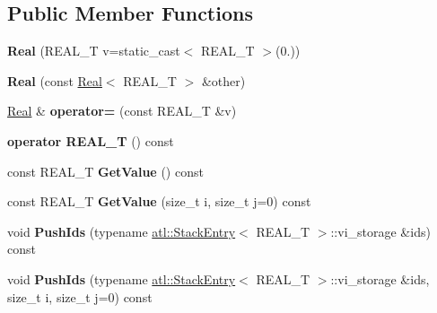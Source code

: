 \subsection*{Public Member Functions}
\begin{DoxyCompactItemize}
\item 
\hypertarget{structatl_1_1_real_a3ef54e5b25ee5800cb9cc3a6702e54c2}{{\bfseries Real} (R\+E\+A\+L\+\_\+\+T v=static\+\_\+cast$<$ R\+E\+A\+L\+\_\+\+T $>$(0.))}\label{structatl_1_1_real_a3ef54e5b25ee5800cb9cc3a6702e54c2}

\item 
\hypertarget{structatl_1_1_real_abdc6f5cef7138b4699f6405eed513864}{{\bfseries Real} (const \hyperlink{structatl_1_1_real}{Real}$<$ R\+E\+A\+L\+\_\+\+T $>$ \&other)}\label{structatl_1_1_real_abdc6f5cef7138b4699f6405eed513864}

\item 
\hypertarget{structatl_1_1_real_ab0ff33ff7cb2b6b75e69c50e648ae780}{\hyperlink{structatl_1_1_real}{Real} \& {\bfseries operator=} (const R\+E\+A\+L\+\_\+\+T \&v)}\label{structatl_1_1_real_ab0ff33ff7cb2b6b75e69c50e648ae780}

\item 
\hypertarget{structatl_1_1_real_a18df517fb08814575164e6d87cf637bc}{{\bfseries operator R\+E\+A\+L\+\_\+\+T} () const }\label{structatl_1_1_real_a18df517fb08814575164e6d87cf637bc}

\item 
\hypertarget{structatl_1_1_real_a2f5cb2f25c49951421acad1bf3acf340}{const R\+E\+A\+L\+\_\+\+T {\bfseries Get\+Value} () const }\label{structatl_1_1_real_a2f5cb2f25c49951421acad1bf3acf340}

\item 
\hypertarget{structatl_1_1_real_a6e8a09189115773e192963fc2a2ade8e}{const R\+E\+A\+L\+\_\+\+T {\bfseries Get\+Value} (size\+\_\+t i, size\+\_\+t j=0) const }\label{structatl_1_1_real_a6e8a09189115773e192963fc2a2ade8e}

\item 
\hypertarget{structatl_1_1_real_a5cb2b8223c6214ab4e157dd0d7f1a13e}{void {\bfseries Push\+Ids} (typename \hyperlink{structatl_1_1_stack_entry}{atl\+::\+Stack\+Entry}$<$ R\+E\+A\+L\+\_\+\+T $>$\+::vi\+\_\+storage \&ids) const }\label{structatl_1_1_real_a5cb2b8223c6214ab4e157dd0d7f1a13e}

\item 
\hypertarget{structatl_1_1_real_ae34aba11b0da584a407b7d02ac6631be}{void {\bfseries Push\+Ids} (typename \hyperlink{structatl_1_1_stack_entry}{atl\+::\+Stack\+Entry}$<$ R\+E\+A\+L\+\_\+\+T $>$\+::vi\+\_\+storage \&ids, size\+\_\+t i, size\+\_\+t j=0) const }\label{structatl_1_1_real_ae34aba11b0da584a407b7d02ac6631be}


\end{DoxyCompactItemize}
